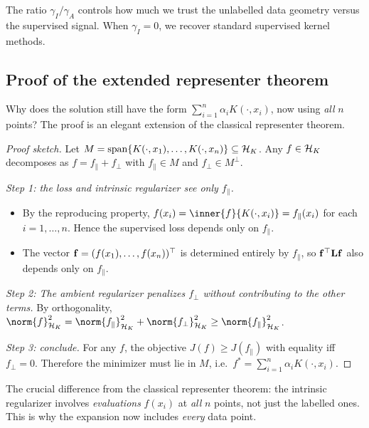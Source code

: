 \begin{notechapter}
\begin{intuition}
The ratio $\gamma_I / \gamma_A$ controls how much we trust the
unlabelled data geometry versus the supervised signal. When
$\gamma_I = 0$, we recover standard supervised kernel methods.
\end{intuition}

\subsection{Proof of the extended representer theorem}
\label{rkhs:subsec:manifold_representer_proof}

Why does the solution still have the form $\sum_{i=1}^n \alpha_i
K(\cdot, x_i)$, now using \emph{all} $n$ points? The proof is an
elegant extension of the classical representer theorem.

\begin{proof}[Proof sketch]
Let $M = \operatorname{span}\{K(\cdot, x_1), \ldots, K(\cdot, x_n)\} \subseteq \mathcal{H}_K$.
Any $f \in \mathcal{H}_K$ decomposes as $f = f_\parallel + f_\perp$ with
$f_\parallel \in M$ and $f_\perp \in M^\perp$.

\smallskip
\emph{Step 1: the loss and intrinsic regularizer see only $f_\parallel$.}
\begin{itemize}
  \item By the reproducing property, $f(x_i) = \inner{f}{K(\cdot, x_i)}
    = f_\parallel(x_i)$ for each $i = 1,\ldots,n$. Hence the supervised
    loss depends only on $f_\parallel$.
  \item The vector $\mathbf{f} = (f(x_1),\ldots,f(x_n))^\top$ is determined
    entirely by $f_\parallel$, so $\mathbf{f}^\top \mathbf{L} \mathbf{f}$ also
    depends only on $f_\parallel$.
\end{itemize}

\emph{Step 2: The ambient regularizer penalizes $f_\perp$ without
contributing to the other terms.}
By orthogonality, $\norm{f}_{\hk}^2 = \norm{f_\parallel}_{\hk}^2
+ \norm{f_\perp}_{\hk}^2 \geq \norm{f_\parallel}_{\hk}^2$.

\emph{Step 3: conclude.}
For any $f$, the objective $J(f) \geq J(f_\parallel)$ with equality
iff $f_\perp = 0$. Therefore the minimizer must lie in $M$, i.e.\
$f^* = \sum_{i=1}^n \alpha_i K(\cdot, x_i)$.
\end{proof}

\begin{remark}
The crucial difference from the classical representer theorem: the
intrinsic regularizer involves \emph{evaluations} $f(x_i)$ at
\emph{all} $n$ points, not just the labelled ones. This is why the
expansion now includes \emph{every} data point.
\end{remark}


\end{notechapter}
